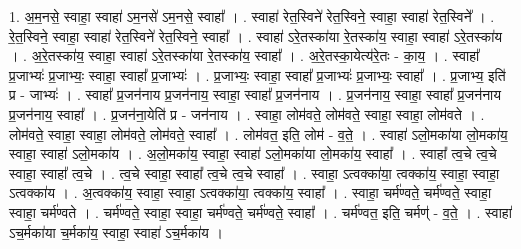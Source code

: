 \documentclass[17pt]{extarticle}
\begin{document}
1. अ॒म॒नसे॒ स्वाहा॒ स्वाहा॑ ऽम॒नसे॑ ऽम॒नसे॒ स्वाहा᳚ । . स्वाहा॑ रेत॒स्विने॑ रेत॒स्विने॒ स्वाहा॒ स्वाहा॑ रेत॒स्विने᳚ । . रे॒त॒स्विने॒ स्वाहा॒ स्वाहा॑ रेत॒स्विने॑ रेत॒स्विने॒ स्वाहा᳚ । . स्वाहा॑ ऽरे॒तस्का॑या रे॒तस्का॑य॒ स्वाहा॒ स्वाहा॑ ऽरे॒तस्का॑य । . अ॒रे॒तस्का॑य॒ स्वाहा॒ स्वाहा॑ ऽरे॒तस्का॑या रे॒तस्का॑य॒ स्वाहा᳚ । . अ॒रे॒तस्का॒येत्य॑रे॒तः - का॒य॒ । . स्वाहा᳚ प्र॒जाभ्यः॑ प्र॒जाभ्यः॒ स्वाहा॒ स्वाहा᳚ प्र॒जाभ्यः॑ । . प्र॒जाभ्यः॒ स्वाहा॒ स्वाहा᳚ प्र॒जाभ्यः॑ प्र॒जाभ्यः॒ स्वाहा᳚ । . प्र॒जाभ्य॒ इति॑ प्र - जाभ्यः॑ । . स्वाहा᳚ प्र॒जन॑नाय प्र॒जन॑नाय॒ स्वाहा॒ स्वाहा᳚ प्र॒जन॑नाय । . प्र॒जन॑नाय॒ स्वाहा॒ स्वाहा᳚ प्र॒जन॑नाय प्र॒जन॑नाय॒ स्वाहा᳚ । . प्र॒जन॑ना॒येति॑ प्र - जन॑नाय । . स्वाहा॒ लोम॑वते॒ लोम॑वते॒ स्वाहा॒ स्वाहा॒ लोम॑वते । . लोम॑वते॒ स्वाहा॒ स्वाहा॒ लोम॑वते॒ लोम॑वते॒ स्वाहा᳚ । . लोम॑वत॒ इति॒ लोम॑ - व॒ते॒ । . स्वाहा॑ ऽलो॒मका॑या लो॒मका॑य॒ स्वाहा॒ स्वाहा॑ ऽलो॒मका॑य । . अ॒लो॒मका॑य॒ स्वाहा॒ स्वाहा॑ ऽलो॒मका॑या लो॒मका॑य॒ स्वाहा᳚ । . स्वाहा᳚ त्व॒चे त्व॒चे स्वाहा॒ स्वाहा᳚ त्व॒चे । . त्व॒चे स्वाहा॒ स्वाहा᳚ त्व॒चे त्व॒चे स्वाहा᳚ । . स्वाहा॒ ऽत्वक्का॑या॒ त्वक्का॑य॒ स्वाहा॒ स्वाहा॒ ऽत्वक्का॑य । . अ॒त्वक्का॑य॒ स्वाहा॒ स्वाहा॒ ऽत्वक्का॑या॒ त्वक्का॑य॒ स्वाहा᳚ । . स्वाहा॒ चर्म॑ण्वते॒ चर्म॑ण्वते॒ स्वाहा॒ स्वाहा॒ चर्म॑ण्वते । . चर्म॑ण्वते॒ स्वाहा॒ स्वाहा॒ चर्म॑ण्वते॒ चर्म॑ण्वते॒ स्वाहा᳚ । . चर्म॑ण्वत॒ इति॒ चर्मण्॑ - व॒ते॒ । . स्वाहा॑ ऽच॒र्मका॑या च॒र्मका॑य॒ स्वाहा॒ स्वाहा॑ ऽच॒र्मका॑य । \newline
\end{document}
